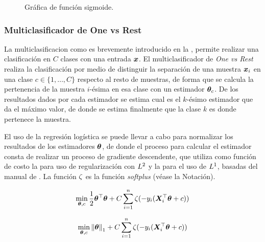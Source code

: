 \begin{figure}[H]
  \centering
\decoRule
\caption[Gráfica de función sigmoide]{Gráfica de función sigmoide.}
\label{fig:logits-example}
\end{figure}


\subsubsection{Multiclasificador de One vs Rest}
La multiclasificacion como es brevemente introducido en la , permite realizar una clasificación en $C$ clases con una entrada ${\bm{x}}$. El multiclasificador de \emph{One vs Rest} realiza la clasificación por medio de distinguir la separación de una muestra ${\bm{x}}_i$ en una clase $c \in \{1, \ldots, C\}$ respecto al resto de muestras, de forma que se calcula la pertenencia de la muestra $i$-\'esima en esa clase con un estimador ${\bm{\theta}}_c$. De los resultados dados por cada estimador se estima cual es el $k$-\'esimo estimador que da el máximo valor, de donde se estima finalmente que la clase $k$ es donde pertenece la muestra.

El uso de la regresión logística se puede llevar a cabo para normalizar los resultados de los estimadores ${\bm{\theta}}$, de donde el proceso para calcular el estimador consta de realizar un proceso de gradiente descendente, que utiliza como función de costo la  para uso de regularización con $L^2$ y la  para el uso de $L^1$, basadas del manual de \cite{sklearn_api}. La función $\zeta$ es la función \emph{softplus} (véase la Notación).

\begin{equation} \label{eq:ovr-reg-l2costfunc}
  \min_{{\bm{\theta}}, c} \frac{1}{2}{\bm{\theta}}^{\top} {\bm{\theta}} + C \sum_{i=1}^n \zeta(- y_i ({\bm{X}}_i^{\top} {\bm{\theta}} + c))
\end{equation}

\begin{equation} \label{eq:ovr-reg-l1costfunc}
  \min_{{\bm{\theta}}, c} \left\lVert{\bm{\theta}}\right\rVert_1 + C \sum_{i=1}^n \zeta(- y_i ({\bm{X}}_i^{\top} {\bm{\theta}} + c))
\end{equation}

